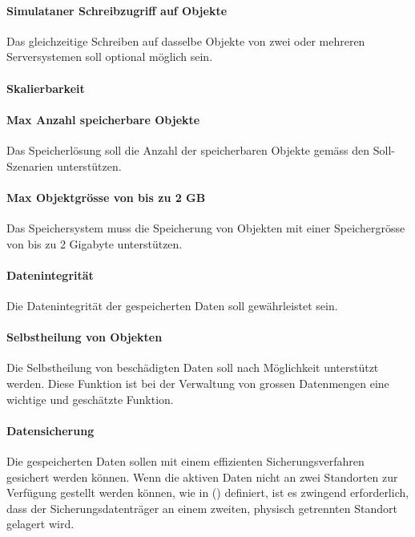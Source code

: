 \paragraph{Simulataner Schreibzugriff auf Objekte}\label{Soll-3-5}
Das gleichzeitige Schreiben auf dasselbe Objekte von zwei oder mehreren Serversystemen soll optional möglich sein.

\setcounter{paragraph}{0}
\renewcommand\theparagraph{Soll-4-\arabic{paragraph}}

\paragraph{Skalierbarkeit}\label{Soll-4-1}

\paragraph{Max Anzahl speicherbare Objekte}\label{Soll-4-2}
Das Speicherlösung soll die Anzahl der speicherbaren Objekte gemäss den Soll-Szenarien unterstützen. 

\paragraph{Max Objektgrösse von bis zu 2 GB}\label{Soll-4-3}
Das Speichersystem muss die Speicherung von Objekten mit einer Speichergrösse von bis zu 2 Gigabyte unterstützen.

\setcounter{paragraph}{0}
\renewcommand\theparagraph{Soll-5-\arabic{paragraph}}

\paragraph{Datenintegrität}\label{Soll-5-1}
Die Datenintegrität der gespeicherten Daten soll gewährleistet sein.

\paragraph{Selbstheilung von Objekten}\label{Soll-5-2}
Die Selbstheilung von beschädigten Daten soll nach Möglichkeit unterstützt werden. Diese Funktion ist bei der Verwaltung von grossen Datenmengen eine wichtige und geschätzte Funktion.

\paragraph{Datensicherung}\label{Soll-5-3}
Die gespeicherten Daten sollen mit einem effizienten Sicherungsverfahren gesichert werden können. Wenn die aktiven Daten nicht an zwei Standorten zur Verfügung gestellt werden können, wie in () definiert, ist es zwingend erforderlich, dass der Sicherungsdatenträger an einem zweiten, physisch getrennten Standort gelagert wird.

